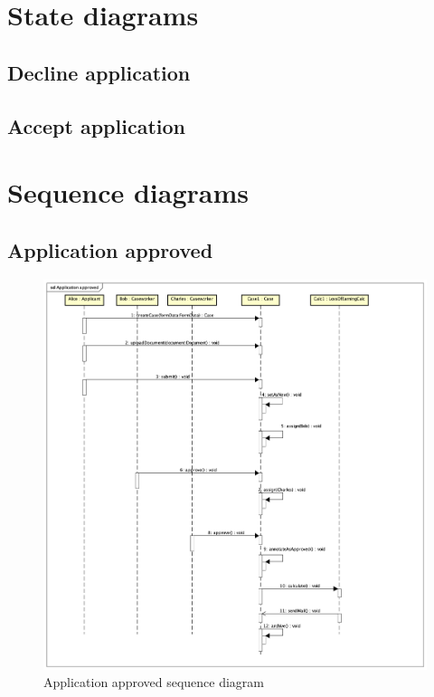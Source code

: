 \newpage
\section{State diagrams}

\subsection{Decline application}

\subsection{Accept application}

\section{Sequence diagrams}

\subsection{Application approved}

\begin{figure}[htb!]
    \centering
    \includegraphics[width=\textwidth]{img/sd-application-approved.png}
    \caption{Application approved sequence diagram}
    \label{fig:my_label}
\end{figure}


